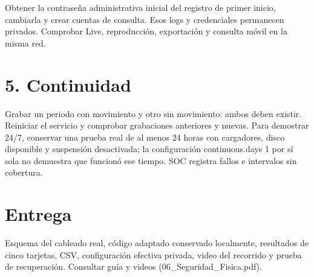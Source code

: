 \documentclass[12pt,a4paper]{article}
\begin{document}
Obtener la contraseña administrativa inicial del registro de primer inicio, cambiarla y crear cuentas de consulta. Esos logs y credenciales permanecen privados. Comprobar Live, reproducción, exportación y consulta móvil en la misma red.\par
{}\section*{5. Continuidad}
Grabar un periodo con movimiento y otro sin movimiento: ambos deben existir. Reiniciar el servicio y comprobar grabaciones anteriores y nuevas. Para demostrar 24/7, conservar una prueba real de al menos 24 horas con cargadores, disco disponible y suspensión desactivada; la configuración continuous.days 1 por sí sola no demuestra que funcionó ese tiempo. SOC registra fallos e intervalos sin cobertura.\par
{}\section*{Entrega}
Esquema del cableado real, código adaptado conservado localmente, resultados de cinco tarjetas, CSV, configuración efectiva privada, video del recorrido y prueba de recuperación. Consultar guía y videos (06\_Seguridad\_Fisica.pdf).\par
\end{document}
